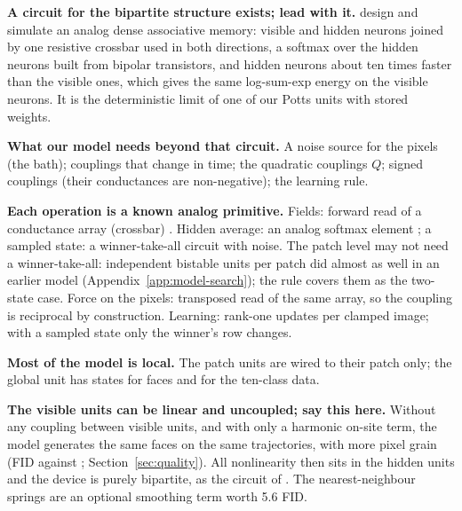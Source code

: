 \begin{plan}
  \item \textbf{A circuit for the bipartite structure exists; lead with it.}
        \citet{bacvanski2025dense} design and simulate an analog dense
        associative memory: visible and hidden neurons joined by one resistive
        crossbar used in both directions, a softmax over the hidden neurons
        built from bipolar transistors, and hidden neurons about ten times
        faster than the visible ones, which gives the same log-sum-exp energy
        on the visible neurons. It is the deterministic limit of one of our
        Potts units with stored weights.
  \item \textbf{What our model needs beyond that circuit.} A noise source for
        the pixels (the bath); couplings that change in time; the quadratic
        couplings $Q$; signed couplings (their conductances are non-negative);
        the learning rule.
  \item \textbf{Each operation is a known analog primitive.}
        Fields: forward read of a conductance array (crossbar)
        \citep{wan2022neurram}.
        Hidden average: an analog softmax element \citep{elfadel1993softmax};
        a sampled state: a winner-take-all circuit with noise.
        The patch level may not need a winner-take-all: independent bistable
        units per patch did almost as well in an earlier model
        (Appendix~\ref{app:model-search}); the rule covers them as the
        two-state case.
        Force on the pixels: transposed read of the same array, so the coupling
        is reciprocal by construction.
        Learning: rank-one updates per clamped image; with a sampled state only
        the winner's row changes.
  \item \textbf{Most of the model is local.} The patch units are wired to
        their patch only; the global unit has \Kglobal{} states for faces and
        \KglobalClasses{} for the ten-class data.
  \item \textbf{The visible units can be linear and uncoupled; say this
        here.} Without any coupling between visible units, and with only a
        harmonic on-site term, the model generates the same faces on the same
        trajectories, with more pixel grain (FID \FIDablHarmonic{} against
        \FIDcelebLowExact; Section~\ref{sec:quality}). All nonlinearity then
        sits in the hidden units and the device is purely bipartite, as the
        circuit of \citet{bacvanski2025dense}. The nearest-neighbour springs
        are an optional smoothing term worth 5.6 FID.

\end{plan}
